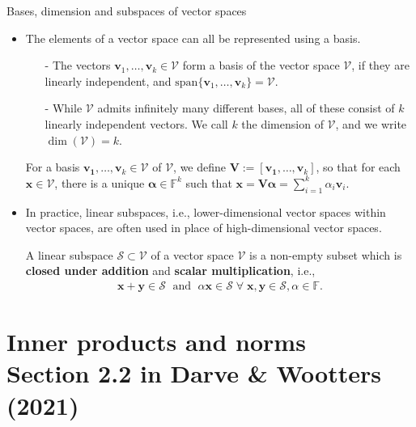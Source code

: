 \documentclass[t,usepdftitle=false]{beamer}
\begin{document}
\begin{frame}{Bases, dimension and subspaces of vector spaces}
\begin{itemize}
\item The elements of a vector space can all be represented using a basis.
\begin{definition}
\begin{itemize}
\item[-] The vectors $\mathbf{v}_1,\dots,\mathbf{v}_k\in\mathcal{V}$ form a basis of the vector space $\mathcal{V}$, if they are linearly independent, and $\text{span}\{\mathbf{v}_1,\dots,\mathbf{v}_k\}=\mathcal{V}$.\vspace{-.15cm}
\item[-] While $\mathcal{V}$ admits infinitely many different bases, all of these consist of $k$ linearly independent vectors. We call $k$ the dimension of $\mathcal{V}$, and we write $\dim(\mathcal{V})=k$.
\end{itemize}
\end{definition}
For a basis $\mathbf{v_1},\dots,\mathbf{v}_k\in\mathcal{V}$ of $\mathcal{V}$, we define $\mathbf{V}:=[\mathbf{v_1},\dots,\mathbf{v}_k]$, so that for each $\mathbf{x}\in\mathcal{V}$, there is a unique $\boldsymbol{\alpha}\in\mathbb{F}^k$ such that $\mathbf{x}=\mathbf{V}\boldsymbol{\alpha}=\sum_{i=1}^k\alpha_i\mathbf{v}_i$.\vspace{.1cm}
\item In practice, linear subspaces, i.e., lower-dimensional vector spaces within vector spaces, are often used in place of high-dimensional vector spaces.
\begin{definition}
A linear subspace $\mathcal{S}\subset \mathcal{V}$ of a vector space $\mathcal{V}$ is a non-empty subset which is \textbf{closed under addition} and \textbf{scalar multiplication}, i.e.,\vspace*{-.2cm}
\begin{align*}
\mathbf{x}+\mathbf{y}\in \mathcal{S}\;\text{ and }\;\alpha \mathbf{x}\in \mathcal{S}\;\forall\;\mathbf{x},\mathbf{y}\in \mathcal{S},\alpha\in\mathbb{F}.
\end{align*}
\end{definition}
\end{itemize}
\end{frame}

\section{Inner products and norms\\{\small Section 2.2 in Darve \& Wootters (2021)}}
\end{document}
